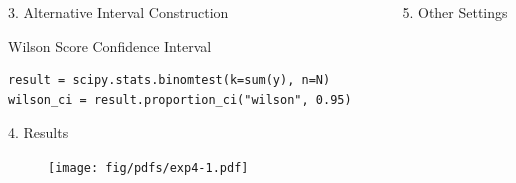 \documentclass[final]{beamer}
\newlength{\sepwidth}
\newlength{\colwidth}
\newcommand{\separatorcolumn}{\begin{column}{\sepwidth}\end{column}}
\begin{document}
\begin{frame}[fragile]
\begin{columns}[t]
\begin{column}{\colwidth}
\begin{block}{3. Alternative Interval Construction}
    \begin{pbox}[label={ex:wilson_simple}]{Wilson Score Confidence Interval}
    \begin{verbatim}
result = scipy.stats.binomtest(k=sum(y), n=N)
wilson_ci = result.proportion_ci("wilson", 0.95)
    \end{verbatim}
    \end{pbox}




  
  \end{block}

  \vspace{-1em}

  \begin{block}{4. Results}

    \begin{figure}
      \centering
      \texttt{[image: fig/pdfs/exp4-1.pdf]}
    \end{figure}

  \end{block}

\end{column}

\separatorcolumn

\begin{column}{\colwidth}

  \begin{exampleblock}{5. Other Settings}


\end{exampleblock}
\end{column}
\end{columns}
\end{frame}
\end{document}
